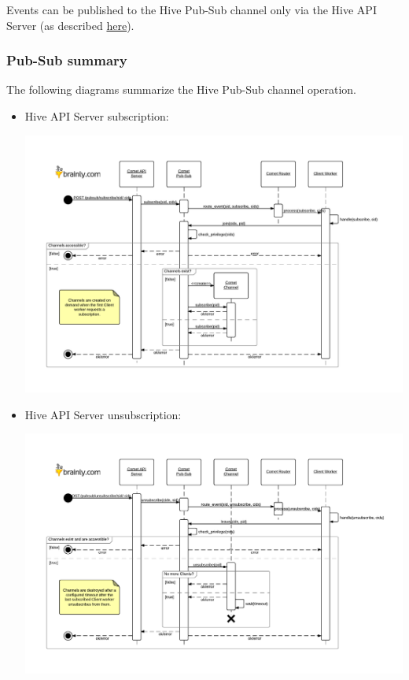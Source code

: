 \documentclass[a4paper]{article}
\begin{document}
\noindent
Events can be published to the Hive Pub-Sub channel only via the Hive API Server (as described \hyperref[sec-6-1-6]{here}).
\subsubsection{Pub-Sub summary}
\label{sec-7-3-4}

The following diagrams summarize the Hive Pub-Sub channel operation.

\pagebreak
\begin{landscape}
\begin{itemize}

\item Hive API Server subscription:
\label{sec-7-3-4-1}%
\begin{center}
\includegraphics[scale=0.85]{./img/pubsub_api_subscription.pdf}
\end{center}

\pagebreak

\item Hive API Server unsubscription:
\label{sec-7-3-4-2}%
\begin{center}
\includegraphics[scale=0.9]{./img/pubsub_api_unsubscription.pdf}
\end{center}


\end{itemize}
\end{landscape}
\end{document}
